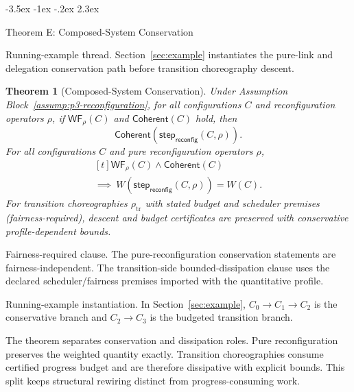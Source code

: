 \documentclass[a4paper,10pt,twocolumn,english]{article}
\makeatletter
\renewcommand{\section}{\@startsection{section}{1}{\z@}%
  {-3.5ex \@plus -1ex \@minus -.2ex}%
  {2.3ex}%
  {\raggedright\normalfont\large\bfseries}}
\numberwithin{equation}{section}
\theoremstyle{paperdef}
\theoremstyle{paperplain}
\newtheorem{theorem}[definition]{Theorem}
\theoremstyle{paperdef}
\theoremstyle{paperremark}
\theoremstyle{paperdef}
\newcommand{\Coherent}{\ensuremath{\mathsf{Coherent}}}
\makeatother
\begin{document}
\section{Theorem E: Composed-System Conservation}
\label{sec:theorem-e}

Running-example thread. Section~\ref{sec:example} instantiates the pure-link and
delegation conservation path before transition choreography descent.

\begin{theorem}[Composed-System Conservation]
	\label{thm:conservation}
	Under Assumption Block~\ref{assump:p3-reconfiguration}, for all configurations $C$ and reconfiguration operators $\rho$, if $\mathsf{WF}_\rho(C)$ and $\Coherent(C)$ hold, then
	\begin{equation}
		\Coherent(\mathsf{step}_{\mathsf{reconfig}}(C,\rho)).
	\end{equation}
	For all configurations $C$ and pure reconfiguration operators $\rho$,
	\begin{equation}
		\begin{aligned}[t]
			\mathsf{WF}_\rho(C) \land \Coherent(C)
			\\
			\implies\ W(\mathsf{step}_{\mathsf{reconfig}}(C,\rho)) = W(C).
		\end{aligned}
	\end{equation}
	For transition choreographies $\rho_{\mathrm{tr}}$ with stated budget and scheduler premises (fairness-required), descent and budget certificates are preserved with conservative profile-dependent bounds.
\end{theorem}

Fairness-required clause. The pure-reconfiguration conservation statements are
fairness-independent. The transition-side bounded-dissipation clause uses the
declared scheduler/fairness premises imported with the quantitative profile.

Running-example instantiation. In Section~\ref{sec:example}, $C_0 \to C_1 \to
	C_2$ is the conservative branch and $C_2 \to C_3$ is the budgeted transition
branch.

The theorem separates conservation and dissipation roles. Pure reconfiguration preserves the weighted quantity exactly. Transition choreographies consume certified progress budget and are therefore dissipative with explicit bounds. This split keeps structural rewiring distinct from progress-consuming work.
\end{document}
